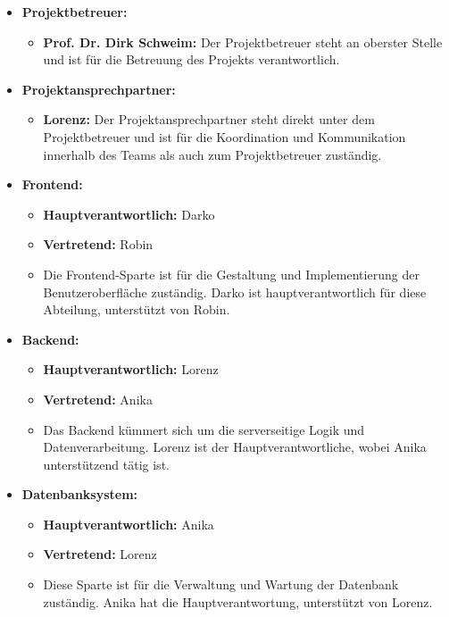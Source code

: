 \begin{itemize}
    \item \textbf{Projektbetreuer:}
    \begin{itemize}
        \item \textbf{Prof. Dr. Dirk Schweim:} Der Projektbetreuer steht an oberster Stelle und ist für die Betreuung des Projekts verantwortlich.
    \end{itemize}

    \item \textbf{Projektansprechpartner:}
    \begin{itemize}
        \item \textbf{Lorenz:} Der Projektansprechpartner steht direkt unter dem Projektbetreuer und ist für die Koordination und Kommunikation innerhalb des Teams als auch zum Projektbetreuer zuständig.
    \end{itemize}

    \item \textbf{Frontend:}
    \begin{itemize}
        \item \textbf{Hauptverantwortlich:} Darko
        \item \textbf{Vertretend:} Robin
        \item Die Frontend-Sparte ist für die Gestaltung und Implementierung der Benutzeroberfläche zuständig.
        Darko ist hauptverantwortlich für diese Abteilung, unterstützt von Robin.
    \end{itemize}

    \item \textbf{Backend:}
    \begin{itemize}
        \item \textbf{Hauptverantwortlich:} Lorenz
        \item \textbf{Vertretend:} Anika
        \item Das Backend kümmert sich um die serverseitige Logik und Datenverarbeitung.
        Lorenz ist der Hauptverantwortliche, wobei Anika unterstützend tätig ist.
    \end{itemize}

    \item \textbf{Datenbanksystem:}
    \begin{itemize}
        \item \textbf{Hauptverantwortlich:} Anika
        \item \textbf{Vertretend:} Lorenz
        \item Diese Sparte ist für die Verwaltung und Wartung der Datenbank zuständig.
        Anika hat die Hauptverantwortung, unterstützt von Lorenz.
    \end{itemize}


\end{itemize}
